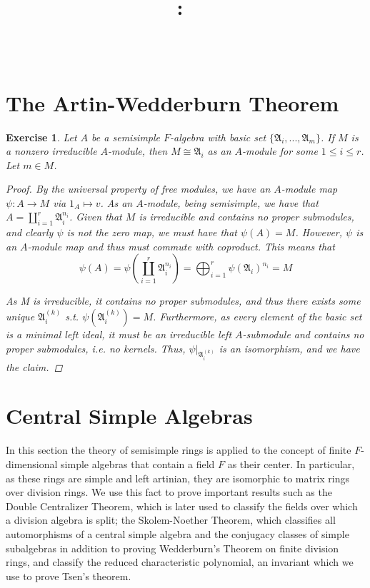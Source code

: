 \documentclass{article}
\title{
    \vspace{2in}
    \textmd{\textbf{\hmwkClass:\ \hmwkTitle}}\\
    \vspace{0.3in}\large{\textit{\hmwkClassInstructor\  }}
    \vspace{2in}
}
\author{\hmwkAuthorName}
\date{}
\newtheorem{exercise}{Exercise}[section]
\begin{document}
\maketitle

\pagebreak

\section{The Artin-Wedderburn Theorem}

\begin{exercise}
  
  Let $A$ be a semisimple $F$-algebra with basic set $\{\mathfrak{A}_{i},...,\mathfrak{A}_{m}\}$. If $M$ is a nonzero irreducible $A$-module, then $M \cong \mathfrak{A}_{i}$ as an $A$-module for some $1 \leq i \leq r$. Let $m \in M$.

\begin{proof}
  
    By the universal property of free modules, we have an $A$-module map $\psi: A \to M$ via $1_{A} \mapsto v$. As an $A$-module, being semisimple, we have that $A = \coprod_{i=1}^{r}\mathfrak{A}_{i}^{n_{i}}$. Given that $M$ is irreducible and contains no proper submodules, and clearly $\psi$ is not the zero map, we must have that $\psi(A) = M$. However, $\psi$ is an $A$-module map and thus must commute with coproduct. This means that
  \[
    \psi(A) = \psi\left(\coprod_{i=1}^{r}\mathfrak{A}_{i}^{n_{i}}\right) = \bigoplus_{i=1}^{r}\psi(\mathfrak{A}_{i})^{n_{i}} = M
  \]

  As M is irreducible, it contains no proper submodules, and thus there exists some unique $\mathfrak{A}_{i}^{(k)}$ s.t. $\psi(\mathfrak{A}_{i}^{(k)}) = M$. Furthermore, as every element of the basic set is a minimal left ideal, it must be an irreducible left $A$-submodule and contains no proper submodules, i.e. no kernels. Thus, $\psi|_{\mathfrak{A}_{i}^{(k)}}$ is an isomorphism, and we have the claim. \end{proof}
\end{exercise}


\pagebreak

\section{Central Simple Algebras}

In this section the theory of semisimple rings is applied to the concept of finite $F$-dimensional simple algebras that contain a field $F$ as their center. In particular, as these rings are simple and left artinian, they are isomorphic to matrix rings over division rings. We use this fact to prove important results such as the Double Centralizer Theorem, which is later used to classify the fields over which a division algebra is split; the Skolem-Noether Theorem, which classifies all automorphisms of a central simple algebra and the conjugacy classes of simple subalgebras in addition to proving Wedderburn's Theorem on finite division rings, and classify the reduced characteristic polynomial, an invariant which we use to prove Tsen's theorem.
\end{document}
